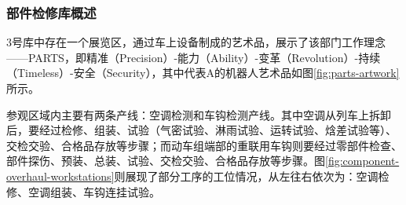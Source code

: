 \subsubsection{部件检修库概述}
3号库中存在一个展览区，通过车上设备制成的艺术品，展示了该部门工作理念——PARTS，即精准（Precision）-能力（Ability）-变革（Revolution）-持续（Timeless）-安全（Security），其中代表A的机器人艺术品如图\ref{fig:parts-artwork}所示。\par{}
参观区域内主要有两条产线：空调检测和车钩检测产线。其中空调从列车上拆卸后，要经过检修、组装、试验（气密试验、淋雨试验、运转试验、焓差试验等）、交检交验、合格品存放等步骤；而动车组端部的重联用车钩则要经过零部件检查、部件探伤、预装、总装、试验、交检交验、合格品存放等步骤。图\ref{fig:component-overhaul-workstations}则展现了部分工序的工位情况，从左往右依次为：空调检修、空调组装、车钩连挂试验。\par{}

